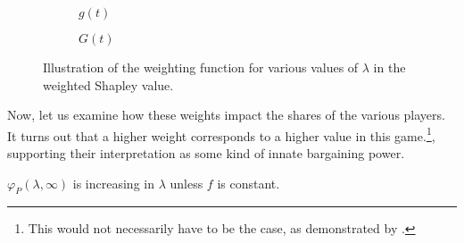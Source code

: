 \begin{figure}[ht]
    \centering
    \begin{subfigure}[b]{0.45\textwidth}
        \centering
        \caption{$g(t)$}
    \end{subfigure}
    \begin{subfigure}[b]{0.45\textwidth}
        \centering
        \caption{$G(t)$}
    \end{subfigure}
    \caption{Illustration of the weighting function for various values of $\lambda$ in the weighted Shapley value.}
    \label{fig:weigh_function}
\end{figure}

Now, let us examine how these weights impact the shares of the various players.
It turns out that a higher weight corresponds to a higher value in this game.\footnote{
    This would not necessarily have to be the case, as demonstrated by \textcite{owen1968communications}.
},
supporting their interpretation as some kind of innate bargaining power.
\begin{corollary}
    \label{cor:platform_value_weighted}
    $\varphi_P(\lambda, \infty)$ is increasing in $\lambda$ unless $f$ is constant.
\end{corollary}

